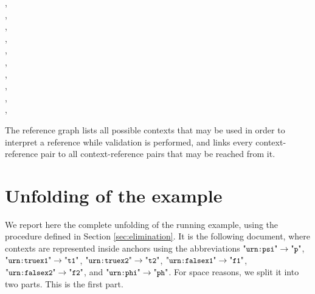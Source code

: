 \begin{toappendix}
{\begin{tabbing}
                 ,  \\
                 ,  \\
                 ,  \\
                 ,  \-\-\\
          , \+\\
             , \+ \\
                 ,  \\
                 ,  \\
                 ,  \\
                 ,  \-\-\-\-\\

\end{tabbing}

The reference graph lists all possible contexts that may be used in order to interpret a reference while validation is performed, and links every context-reference pair to all context-reference pairs that may be reached from it.
}%

{
\newpage

\section{Unfolding of the example}\label{sec:unfolding}

We report here the complete unfolding of the running example, using the procedure defined in Section
\ref{sec:elimination}. It is
the following document, where contexts are represented inside anchors 
using the abbreviations $\qkw{urn:psi}\rightarrow\qkw{p}$, 
$\qkw{urn:truex1}\rightarrow\qkw{t1}$, $\qkw{urn:truex2}\rightarrow\qkw{t2}$,
$\qkw{urn:falsex1}\rightarrow\qkw{f1}$, $\qkw{urn:falsex2}\rightarrow\qkw{f2}$,
and $\qkw{urn:phi}\rightarrow\qkw{ph}$. For space reasons, we split it into two parts. This is the first part.


}
\end{toappendix}
